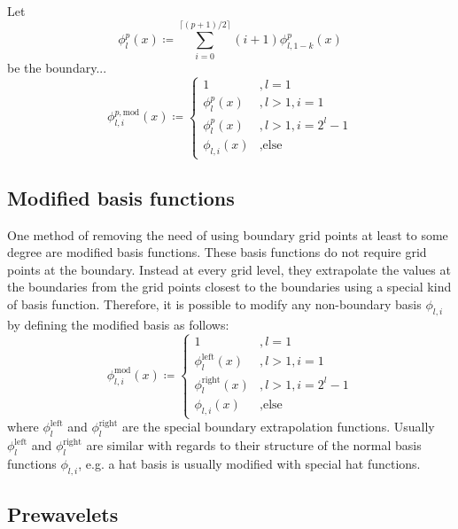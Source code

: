 \documentclass[
  a4paper,  %
  twoside,  %
  bibliography=totoc,
  headsepline,
  cleardoublepage=empty,
  parskip=half,
  draft=false
]{scrbook}
\begin{document}
\begin{definition}
Let
\begin{equation}
\phi_l^p(x) \coloneqq \sum_{i=0}^{\lceil (p+1)/2 \rceil} (i+1) \phi^p_{l,1-k}(x)
\end{equation}
be the boundary...
\begin{equation}
\phi^{p,\text{mod}}_{l,i}(x) \coloneqq
\begin{cases}
1 &, l=1\\
\phi^p_{l}(x)&, l>1, i=1\\
\phi^p_{l}(x)&, l>1, i=2^l - 1\\
\phi_{l,i}(x)&, \text{else}
\end{cases}
\nonumber
\end{equation}
\end{definition}


\subsection{Modified basis functions}

One method of removing the need of using boundary grid points at least to some degree are modified basis functions.
These basis functions do not require grid points at the boundary.
Instead at every grid level, they extrapolate the values at the boundaries from the grid points closest to the boundaries using a special kind of basis function.
Therefore, it is possible to modify any non-boundary basis $\phi_{l,i}$ by defining the modified basis as follows:
\begin{equation}
\phi^{\text{mod}}_{l,i}(x) \coloneqq
\begin{cases}
1 &, l=1\\
\phi^{\text{left}}_{l}(x)&, l>1, i=1\\
\phi^{\text{right}}_{l}(x)&, l>1, i=2^l - 1\\
\phi_{l,i}(x)&, \text{else}
\end{cases}
\nonumber
\end{equation}
where $\phi^{\text{left}}_{l}$ and $\phi^{\text{right}}_{l}$ are the special boundary extrapolation functions.
Usually $\phi^{\text{left}}_{l}$ and $\phi^{\text{right}}_{l}$ are similar with regards to their structure of the normal basis functions $\phi_{l,i}$, e.g. a hat basis is usually modified with special hat functions.






\subsection{Prewavelets}
\end{document}
